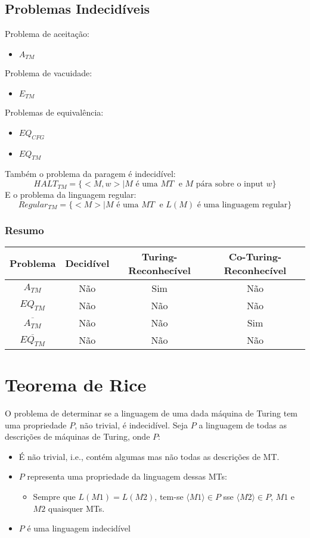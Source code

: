 \documentclass[10pt,a4paper]{report}
\begin{document}
\subsection{Problemas Indecidíveis}
Problema de aceitação:
\begin{itemize}
\item $A_{TM}$
\end{itemize}
Problema de vacuidade:
\begin{itemize}
\item $E_{TM}$
\end{itemize}
Problemas de equivalência:
\begin{itemize}
\item $EQ_{CFG}$
\item $EQ_{TM}$
\end{itemize}
Também o problema da paragem é indecidível:
$$
HALT_{TM} = \{<M,w> | M \text{ é uma } MT \; \text{ e } M \text{ pára sobre o input } w\}
$$
E o problema da linguagem regular:
$$
Regular_{TM} = \{<M> | M \text{ é uma } MT \; \text{ e } L(M) \text{ é uma linguagem regular}\}
$$
\subsubsection{Resumo}
\begin{table}[H]
\begin{tabular}{|c|c|c|c|}
\hline
Problema   & Decidível & Turing-Reconhecível & Co-Turing-Reconhecível \\ \hline
$A_{TM}$  & Não       & Sim                 & Não                    \\ \hline
$EQ_{TM}$ & Não       & Não                 & Não                    \\ \hline
$\overline{A_{TM}}$  & Não       & Não                 & Sim                    \\ \hline
$\overline{EQ_{TM}}$ & Não       & Não                 & Não                    \\ \hline
\end{tabular}
\end{table}

\section{Teorema de Rice}
O problema de determinar se a linguagem de uma dada máquina de Turing tem uma propriedade $P$, não trivial, é indecidível.
Seja $P$ a linguagem de todas as descrições de máquinas de Turing, onde $P$:
\begin{itemize}
\item É não trivial, i.e., contém algumas mas não todas as descrições de MT.
\item $P$ representa uma propriedade da linguagem dessas MTs:
\begin{itemize}
\item Sempre que $L(M1) = L(M2)$, tem-se $\langle M1 \rangle \in P$ sse $\langle M2 \rangle \in P$, $M1$ e $M2$ quaisquer MTs.
\end{itemize}
\item $P$ é uma linguagem indecidível
\end{itemize}
\end{document}
